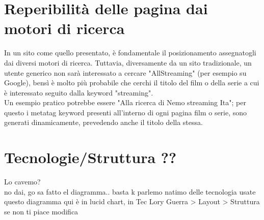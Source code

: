 \section{Reperibilità delle pagina dai motori di ricerca}

In un sito come quello presentato, è fondamentale il posizionamento assegnatogli dai diversi motori di ricerca. Tuttavia, diversamente da un sito tradizionale, un utente generico non sarà interessato a cercare "AllStreaming" (per esempio su Google), bensì è molto più probabile che cerchi il titolo del film o della serie a cui è interessato seguito dalla keyword "streaming".\\ 
Un esempio pratico potrebbe essere "Alla ricerca di Nemo streaming Ita"; per questo i metatag keyword presenti all'interno di ogni pagina film o serie, sono generati dinamicamente, prevedendo anche il titolo della stessa.

\section{Tecnologie/Struttura ??}
Lo cavemo?\\
no dai, go sa fatto el diagramma.. basta k parlemo natimo delle tecnologia usate\\
questo diagramma qui è in lucid chart, in Tec Lory Guerra > Layout > Struttura\\
se non ti piace modifica

